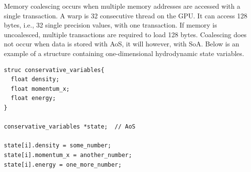 Memory coalescing occurs when multiple memory addresses are accessed with a single transaction.  A warp is 32 consecutive thread on the GPU.  It can access 128 bytes, i.e., 32 single precision values, with one transaction.  If memory is uncoalesced, multiple transactions are required to load 128 bytes.  Coalescing does not occur when data is stored with AoS, it will however, with SoA.  Below is an example of a structure containing one-dimensional hydrodynamic state variables.
\begin{lstlisting}
struc conservative_variables{
  float density;
  float momentum_x;
  float energy;
}

conservative_variables *state;  // AoS

state[i].density = some_number;
state[i].momentum_x = another_number;
state[i].energy = one_more_number;
\end{lstlisting} 

